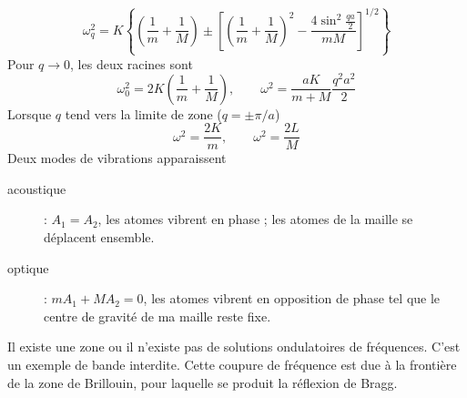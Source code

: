 	\begin{equation}
	\omega_q^2 = K\left\{\left(\frac{1}{m}+\dfrac{1}{M}\right)\pm \left[\left(
	\frac{1}{m}+\frac{1}{M}\right)^2-\dfrac{4\sin^2 \frac{qa}{2}}{mM}\right]^{1/2}
	\right\}
	\end{equation}
	Pour $q\rightarrow 0$, les deux racines sont
	\begin{equation}
	\omega_0^2 = 2K\left(\dfrac{1}{m}+\dfrac{1}{M}\right), \qquad 
	\omega^2 = \dfrac{aK}{m+M}\dfrac{q^2a^2}{2}
	\end{equation}
	Lorsque $q$ tend vers la limite de zone ($q = \pm \pi/a$)
	\begin{equation}
	\omega^2 = \dfrac{2K}{m},\qquad \omega^2 = \dfrac{2L}{M}
	\end{equation}
	Deux modes de vibrations apparaissent
	\begin{description}
	\item[acoustique] : $A_1=A_2$, les atomes vibrent en phase ; les atomes de la 
	maille se déplacent ensemble.
	\item[optique] : $mA_1+MA_2=0$, les atomes vibrent en opposition de phase tel 
	que le centre de gravité de ma maille reste fixe.
	\end{description}
	Il existe une zone ou il n'existe pas de solutions ondulatoires de fréquences. 
	C'est un exemple de bande interdite. Cette coupure de fréquence est due à la 
	frontière de la zone de Brillouin, pour laquelle se produit la réflexion de 
	Bragg.



